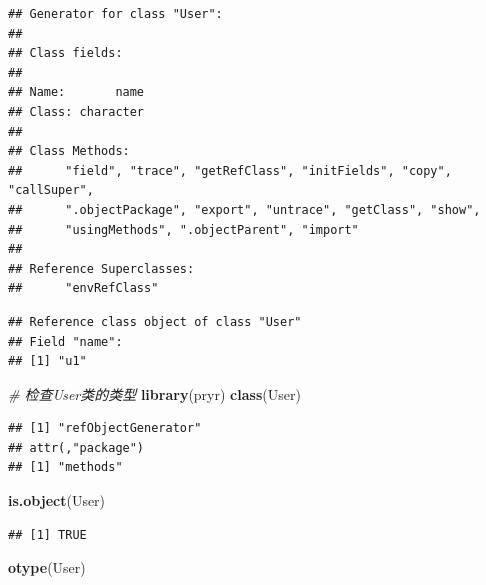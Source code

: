 \documentclass[]{book}
\newenvironment{Shaded}{\begin{snugshade}}{\end{snugshade}}
\newcommand{\KeywordTok}[1]{\textcolor[rgb]{0.13,0.29,0.53}{\textbf{#1}}}
\newcommand{\DataTypeTok}[1]{\textcolor[rgb]{0.13,0.29,0.53}{#1}}
\newcommand{\StringTok}[1]{\textcolor[rgb]{0.31,0.60,0.02}{#1}}
\newcommand{\CommentTok}[1]{\textcolor[rgb]{0.56,0.35,0.01}{\textit{#1}}}
\newcommand{\OperatorTok}[1]{\textcolor[rgb]{0.81,0.36,0.00}{\textbf{#1}}}
\newcommand{\NormalTok}[1]{#1}
\begin{document}
\begin{verbatim}
## Generator for class "User":
## 
## Class fields:
##                 
## Name:       name
## Class: character
## 
## Class Methods: 
##      "field", "trace", "getRefClass", "initFields", "copy", "callSuper", 
##      ".objectPackage", "export", "untrace", "getClass", "show", 
##      "usingMethods", ".objectParent", "import"
## 
## Reference Superclasses: 
##      "envRefClass"
\end{verbatim}

\begin{Shaded}
\end{Shaded}

\begin{verbatim}
## Reference class object of class "User"
## Field "name":
## [1] "u1"
\end{verbatim}

\begin{Shaded}
\begin{Highlighting}[]
\CommentTok{# 检查User类的类型}
\KeywordTok{library}\NormalTok{(pryr)}
\KeywordTok{class}\NormalTok{(User)}
\end{Highlighting}
\end{Shaded}

\begin{verbatim}
## [1] "refObjectGenerator"
## attr(,"package")
## [1] "methods"
\end{verbatim}

\begin{Shaded}
\begin{Highlighting}[]
\KeywordTok{is.object}\NormalTok{(User)}
\end{Highlighting}
\end{Shaded}

\begin{verbatim}
## [1] TRUE
\end{verbatim}

\begin{Shaded}
\begin{Highlighting}[]
\KeywordTok{otype}\NormalTok{(User)}
\end{Highlighting}
\end{Shaded}
\end{document}
